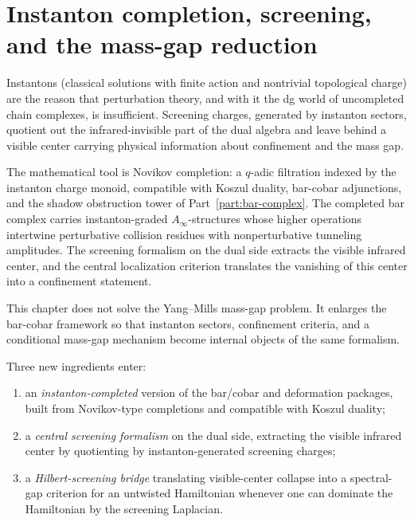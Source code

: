 \chapter{Instanton completion, screening, and the mass-gap reduction}
\label{v1-ch:ym-instanton-screening}


Instantons (classical solutions with finite action and nontrivial
topological charge) are the reason that perturbation theory, and with
it the dg world of uncompleted chain complexes, is insufficient.
Screening charges, generated by instanton sectors, quotient out the
infrared-invisible part of the dual algebra and leave behind a visible
center carrying physical information about confinement and the mass gap.

The mathematical tool is Novikov completion: a $q$-adic filtration
indexed by the instanton charge monoid, compatible with Koszul duality,
bar-cobar adjunctions, and the shadow obstruction tower of Part~\ref{part:bar-complex}. The completed
bar complex carries instanton-graded $A_\infty$-structures whose higher
operations intertwine perturbative collision residues with
nonperturbative tunneling amplitudes. The screening formalism on the
dual side extracts the visible infrared center, and the central
localization criterion translates the vanishing of this center into a
confinement statement.

This chapter does not solve the Yang--Mills mass-gap problem. It
enlarges the bar-cobar framework so that instanton sectors, confinement
criteria, and a conditional mass-gap mechanism become internal objects
of the same formalism.

Three new ingredients enter:
\begin{enumerate}[label=(\roman*)]
\item an \emph{instanton-completed} version of the bar/cobar and
deformation packages, built from Novikov-type completions and
compatible with Koszul duality;
\item a \emph{central screening formalism} on the dual side,
extracting the visible infrared center by quotienting by
instanton-generated screening charges;
\item a \emph{Hilbert-screening bridge} translating visible-center
collapse into a spectral-gap criterion for an untwisted Hamiltonian
whenever one can dominate the Hamiltonian by the screening Laplacian.
\end{enumerate}


